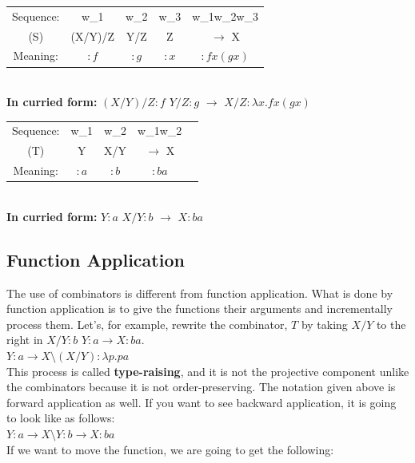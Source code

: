 \documentclass[12pt,a4paper]{article}
\begin{document}
\begin{tabular}{ccccc}
Sequence: & w_{1}   & w_{2} & w_{3} & w_{1}w_{2}w_{3}  \\
(S)       & (X/Y)/Z & Y/Z   & Z     & $\rightarrow$ X     \\
Meaning:          & $:f$      & $:g$    & $:x$    & $:fx(gx)$ \\ \hline
\end{tabular}\\

\textbf{In curried form:} $(X/Y)/Z:f$ $Y/Z:g$ $\rightarrow$ $X/Z:\lambda x.fx(gx)$\\

\begin{tabular}{ccccc}
Sequence: & w_{1}   & w_{2} & w_{1}w_{2}  \\
(T)       & Y & X/Y   & $\rightarrow$ X     \\
Meaning:          & $:a$      & $:b$   & $:ba$ \\ \hline
\end{tabular}\\

\textbf{In curried form:} $Y:a$ $X/Y:b$ $\rightarrow$ $X:ba$\\

\subsection{Function Application}
The use of combinators is different from function application. What is done by function application is to give the functions their arguments and incrementally process them. Let's, for example, rewrite the combinator, $T$ by taking $X/Y$ to the right in $X/Y:b$ $Y:a \rightarrow X:ba$.\\

$Y:a \rightarrow X \setminus (X/Y):\lambda p.pa$\\

\noindent This process is called \textbf{type-raising}, and it is not the projective component unlike the combinators because it is not order-preserving. The notation given above is forward application as well. If you want to see backward application, it is going to look like as follows:\\

$Y:a \rightarrow X \setminus Y:b \rightarrow X:ba$\\

\noindent If we want to move the function, we are going to get the following:\\
\end{document}
